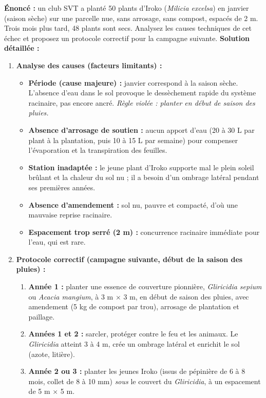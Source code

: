 \documentclass[11pt]{article}
\begin{document}
\begin{exoresolu}
\textbf{Énoncé :} un club SVT a planté 50 plants d'Iroko (\textit{Milicia excelsa}) en janvier (saison sèche) sur une parcelle nue, sans arrosage, sans compost, espacés de 2 m. Trois mois plus tard, 48 plants sont secs. Analysez les causes techniques de cet échec et proposez un protocole correctif pour la campagne suivante.
\tcblower
\textbf{Solution détaillée :}
\begin{enumerate}
    \item \textbf{Analyse des causes (facteurs limitants) :}
    \begin{itemize}
        \item \textbf{Période (cause majeure) :} janvier correspond à la saison sèche. L'absence d'eau dans le sol provoque le dessèchement rapide du système racinaire, pas encore ancré. \textit{Règle violée : planter en début de saison des pluies.}
        \item \textbf{Absence d'arrosage de soutien :} aucun apport d'eau (20 à 30 L par plant à la plantation, puis 10 à 15 L par semaine) pour compenser l'évaporation et la transpiration des feuilles.
        \item \textbf{Station inadaptée :} le jeune plant d'Iroko supporte mal le plein soleil brûlant et la chaleur du sol nu ; il a besoin d'un ombrage latéral pendant ses premières années.
        \item \textbf{Absence d'amendement :} sol nu, pauvre et compacté, d'où une mauvaise reprise racinaire.
        \item \textbf{Espacement trop serré (2 m) :} concurrence racinaire immédiate pour l'eau, qui est rare.
    \end{itemize}
    \item \textbf{Protocole correctif (campagne suivante, début de la saison des pluies) :}
    \begin{enumerate}
        \item \textbf{Année 1 :} planter une essence de couverture pionnière, \textit{Gliricidia sepium} ou \textit{Acacia mangium}, à 3 m $\times$ 3 m, en début de saison des pluies, avec amendement (5 kg de compost par trou), arrosage de plantation et paillage.
        \item \textbf{Années 1 et 2 :} sarcler, protéger contre le feu et les animaux. Le \textit{Gliricidia} atteint 3 à 4 m, crée un ombrage latéral et enrichit le sol (azote, litière).
        \item \textbf{Année 2 ou 3 :} planter les jeunes Iroko (issus de pépinière de 6 à 8 mois, collet de 8 à 10 mm) \textit{sous} le couvert du \textit{Gliricidia}, à un espacement de 5 m $\times$ 5 m.

\end{enumerate}
\end{enumerate}
\end{exoresolu}
\end{document}
